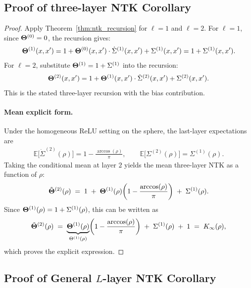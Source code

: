 \subsection{Proof of three-layer NTK Corollary}
\label{appendix:proof-2layer}

\begin{proof}
\label{proof:two_layer_ntk}
Apply Theorem~\ref{thm:ntk_recursion} for \( \ell=1 \) and \( \ell=2 \). For \( \ell=1 \), since \( \boldsymbol{\Theta}^{(0)}=0 \), the recursion gives:
\begin{align}
\boldsymbol{\Theta}^{(1)}(x,x') = 1 + \boldsymbol{\Theta}^{(0)}(x,x')\cdot\dot{\Sigma}^{(1)}(x,x') + \Sigma^{(1)}(x,x') = 1 + \Sigma^{(1)}(x,x').
\end{align}
For \( \ell=2 \), substitute \( \boldsymbol{\Theta}^{(1)} = 1 + \Sigma^{(1)} \) into the recursion:
\begin{align}
\boldsymbol{\Theta}^{(2)}(x,x') = 1 + \boldsymbol{\Theta}^{(1)}(x,x')\cdot\dot{\Sigma}^{(2)}(x,x') + \Sigma^{(2)}(x,x').
\end{align}
This is the stated three-layer recursion with the bias contribution.
\paragraph{Mean explicit form.}
Under the homogeneous ReLU setting on the sphere, the last-layer expectations are
\begin{align}
\mathbb{E}\big[\dot{\Sigma}^{(2)}(\rho)\big] = 1 - \frac{\arccos(\rho)}{\pi},\qquad \mathbb{E}\big[\Sigma^{(2)}(\rho)\big] = \Sigma^{(1)}(\rho).
\end{align}
Taking the conditional mean at layer \(2\) yields the mean three-layer NTK as a function of \( \rho \):
\begin{align}
\tilde{\boldsymbol{\Theta}}^{(2)}(\rho) \;=\; 1 \;+\; \boldsymbol{\Theta}^{(1)}(\rho)\!\left(1-\frac{\arccos(\rho)}{\pi}\right) \;+\; \Sigma^{(1)}(\rho).
\end{align}
Since \( \boldsymbol{\Theta}^{(1)}(\rho) = 1 + \Sigma^{(1)}(\rho) \), this can be written as
\begin{align}
\tilde{\boldsymbol{\Theta}}^{(2)}(\rho) \;=\; \underbrace{\boldsymbol{\Theta}^{(1)}(\rho)}_{\Theta^{(1)}(\rho)}\!\left(1-\frac{\arccos(\rho)}{\pi}\right) \;+\; \Sigma^{(1)}(\rho) \;+\; 1 \;=\; K_\infty(\rho),
\end{align}
which proves the explicit expression.
\end{proof}

\subsection{Proof of General \texorpdfstring{\(L\)}{L}-layer NTK Corollary}
\label{appendix:proof-general-L}

